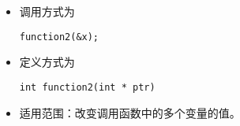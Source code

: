 \begin{frame}[fragile]
\begin{itemize}
\item 调用方式为
\begin{lstlisting}[backgroundcolor=\color{blue!10}]
function2(&x);
\end{lstlisting}
\item 定义方式为
\begin{lstlisting}[backgroundcolor=\color{blue!10}]
int function2(int * ptr)
\end{lstlisting}
\item 适用范围：改变调用函数中的多个变量的值。
\end{itemize}

\end{frame}
